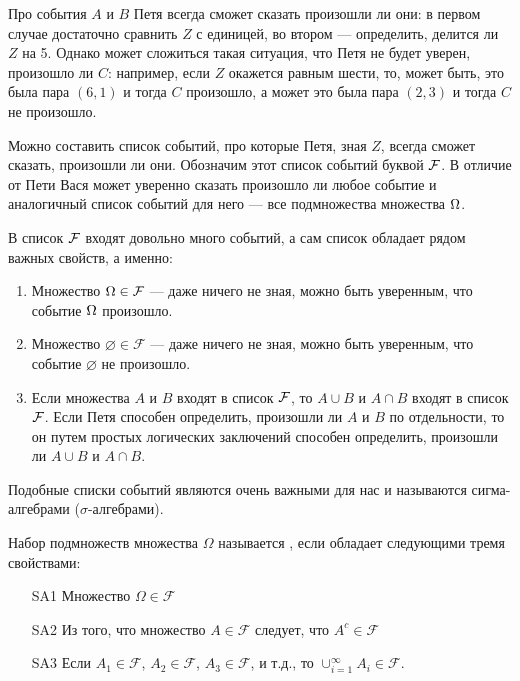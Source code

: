 \documentclass[12pt, a4paper, oneside]{article}
\begin{document}
\begin{sol} 
Про события $A$ и $B$ Петя всегда сможет сказать произошли ли они: в первом случае достаточно сравнить $Z$ с единицей, во втором --- определить, делится ли $Z$ на 5. Однако может сложиться такая ситуация, что Петя не будет уверен, произошло ли $C$: например, если $Z$ окажется равным шести, то, может быть, это была пара $(6,1)$ и тогда $C$ произошло, а может это была пара $(2,3)$ и тогда $C$ не произошло.

Можно составить список событий, про которые Петя, зная $Z$, всегда сможет сказать, произошли ли они. Обозначим этот список событий буквой $\mathcal{F}$. В отличие от Пети Вася может уверенно сказать произошло ли любое событие и аналогичный список событий для него --- все подмножества множества $\Omega$.
\end{sol} 

В список $\mathcal{F}$ входят довольно много событий, а сам список обладает рядом важных свойств, а именно:

\begin{enumerate}
\item  Множество $\Omega \in \mathcal{F}$ --- даже ничего не зная, можно быть уверенным, что событие $\Omega$ произошло.

\item  Множество $\varnothing \in \mathcal{F}$ --- даже ничего не зная, можно быть уверенным, что событие $\varnothing$ не произошло.

\item  Если множества $A$ и $B$ входят в список $\mathcal{F}$, то $A\cup B$ и $A\cap B$ входят в список $\mathcal{F}$. Если Петя способен определить, произошли ли $A$ и $B$ по отдельности, то он путем простых логических заключений способен определить, произошли ли $A\cup B$ и $A\cap B$.
\end{enumerate}

Подобные списки событий являются очень важными для нас и называются сигма-алгебрами ($\sigma$-алгебрами).

\begin{definition}  Набор подмножеств множества $\Omega$ называется , если обладает следующими тремя свойствами:

\begin{enumerate}
\item[SA1] Множество $\Omega \in \mathcal{F}$

\item[SA2] Из того, что множество $A\in \mathcal{F}$ следует, что $A^{c}\in \mathcal{F}$

\item[SA3] Если $A_{1}\in\mathcal{F}$, $A_{2}\in\mathcal{F}$, $A_{3}\in\mathcal{F}$, и т.д., то $\cup_{i=1}^{\infty} A_{i} \in\mathcal{F}$.
\end{enumerate}
\end{definition} 
\end{document}
